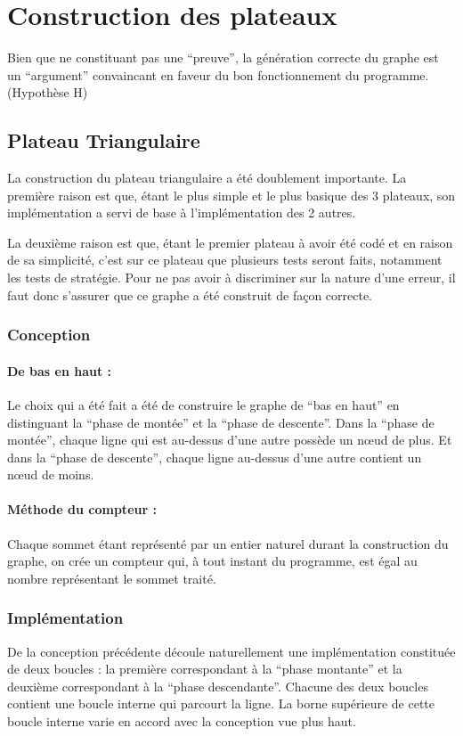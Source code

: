 \section{Construction des plateaux}

Bien que ne constituant pas une ``preuve'', la génération correcte du graphe est un ``argument'' convaincant en faveur du bon fonctionnement du programme.(Hypothèse H) 


\subsection{Plateau Triangulaire}
La construction du plateau triangulaire a été doublement importante. La première raison est que, étant le plus simple et le plus basique des 3 plateaux, son implémentation a servi de base à l'implémentation des 2 autres.

La deuxième raison est que, étant le premier plateau à avoir été codé et en raison de sa simplicité, c'est sur ce plateau que plusieurs tests seront faits, notamment les tests de stratégie. Pour ne pas avoir à discriminer sur la nature d'une erreur, il faut donc s'assurer que ce graphe a été construit de façon correcte.

\subsubsection*{Conception}

\paragraph{De bas en haut :} 
Le choix qui a été fait a été de construire le graphe de ``bas en haut'' en distinguant la ``phase de montée'' et la ``phase de descente''. Dans la ``phase de montée'', chaque ligne qui est au-dessus d'une autre possède un nœud de plus. Et dans la ``phase de descente'', chaque ligne au-dessus d'une autre contient un nœud de moins.     

\paragraph{Méthode du compteur :}
Chaque sommet étant représenté par un entier naturel durant la construction du graphe, on crée un compteur qui, à tout instant du programme, est égal au nombre représentant le sommet traité.

\subsubsection*{Implémentation}
De la conception précédente découle naturellement une implémentation constituée de deux boucles : la première correspondant à la ``phase montante'' et la deuxième correspondant à la ``phase descendante''. Chacune des deux boucles contient une boucle interne qui parcourt la ligne. La borne supérieure de cette boucle interne varie en accord avec la conception vue plus haut.

